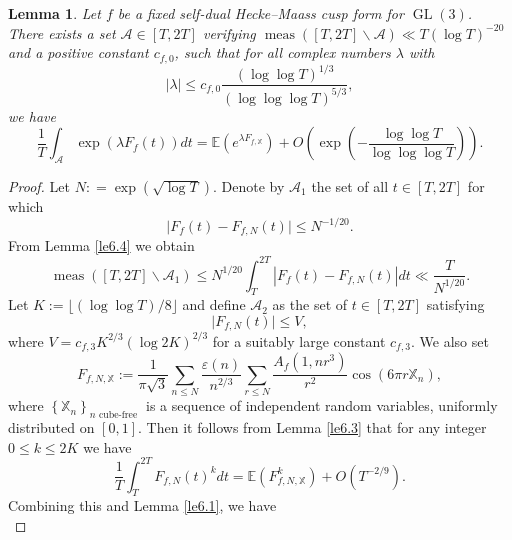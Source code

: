 \documentclass[10pt,a4paper]{amsart}
\newtheorem{lemma}{Lemma}
\begin{document}
\begin{lemma}\label{le6.5}
    Let $f$ be a fixed self-dual Hecke--Maass cusp form for $\operatorname{GL}(3)$. There exists  a set $\mathcal{A} \in[T, 2 T]$ verifying $\operatorname{meas}([T, 2 T] \backslash \mathcal{A}) \ll T(\log T)^{-20}$ and a positive constant $c_{f,0}$, such that for all complex numbers $\lambda$ with
    \[
    |\lambda| \leqslant c_{f,0}\frac{\left(\log\log T\right)^{1/3}}{\left(\log\log\log T\right)^{5/3}},
    \] 
    we have
    \[
    \frac{1}{T} \int_{\mathcal{A}} \exp (\lambda F_f(t)) d t=\mathbb{E}\left(e^{\lambda F_{f,\mathbb{X}}}\right)+O\left(\exp \left(-\frac{\log \log  T}{\log\log \log  T}\right)\right).
    \]
\end{lemma}

\begin{proof}
Let $N: = \exp(\sqrt{\log T})$. Denote by $\mathcal{A}_1$ the set of all $t \in [T, 2T]$ for which
\begin{equation}\label{eq6.4}
\bigl| F_f(t) - F_{f,N}(t) \bigr| \le N^{-1/20}.
\end{equation}
From Lemma \ref{le6.4} we obtain
\begin{equation}\label{eq6.5}
    \operatorname{meas}\left([T, 2 T] \backslash \mathcal{A}_1\right) \leq N^{1 / 20} \int_T^{2 T}\left|F_f(t)-F_{f,N}(t)\right| d t \ll \frac{T}{N^{1 / 20}}.
\end{equation}
Let $K := \bigl\lfloor (\log\log T)/8 \bigr\rfloor$ and define $\mathcal{A}_2$ as the set of $t \in [T, 2T]$ satisfying
\begin{equation}\label{eq6.6}
\bigl| F_{f,N}(t) \bigr| \le V,
\end{equation}
where $V = c_{f,3} K^{2/3}\left(\log 2K\right)^{2/3}$ for a suitably large constant $c_{f,3}$. We also set
\[
F_{f,N, \mathbb{X}}:=\frac{1}{\pi \sqrt{3}} \sum_{n \leqslant N} \frac{\varepsilon(n)}{n^{2 / 3}} \sum_{r \leqslant N} \frac{A_f\left(1,n r^3\right)}{r^{ 2}} \cos \left(6\pi r \mathbb{X}_n\right),
\]
where $\left\{\mathbb{X}_n\right\}_{n \text { cube-free }}$ is a sequence of independent random variables, uniformly distributed on $[0,1]$. Then it follows from Lemma \ref{le6.3} that for any integer $0 \leqslant k \leqslant 2 K$ we have
\begin{equation}\label{eq6.7}
    \frac{1}{T} \int_T^{2 T} F_{f,N}(t)^k d t=\mathbb{E}\left(F_{f,N, \mathbb{X}}^k\right)+O\left(T^{-2 / 9}\right).
\end{equation}
Combining this and  Lemma \ref{le6.1}, we have
\begin{equation}\label{eq6.8}

\end{equation}
\end{proof}
\end{document}
